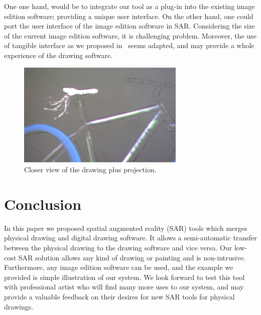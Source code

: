 \documentclass{article}
\begin{document}
One one hand, would be to integrate our tool as a plug-in into the existing image edition software; providing a unique user interface. On the other hand, one could port the user interface of the image edition software in SAR. Considering the size of the current image edition software, it is challenging problem. Moreover, the use of tangible interface as we proposed in~\cite{laviole:2012} seems adapted, and may provide a whole experience of the drawing software. 

\begin{figure}[!tb]
\centering
\includegraphics[width = 80mm]{velo4.JPG}
\caption{Closer view of the drawing plus projection.} 
\label{fig:zoom}
\end{figure}

\section{Conclusion}

In this paper we proposed spatial augmented reality (SAR) tools which merges physical drawing and digital drawing software. It allows a semi-automatic transfer between the physical drawing to the drawing software and vice versa. Our low-cost SAR solution allows any kind of drawing or painting and is non-intrusive. Furthermore, any image edition software can be used, and the example we provided is simple illustration of our system. We look forward to test this tool with professional artist who will find many more uses to our system, and may provide a valuable feedback on their desires for new SAR tools for physical drawings.




\end{document}

